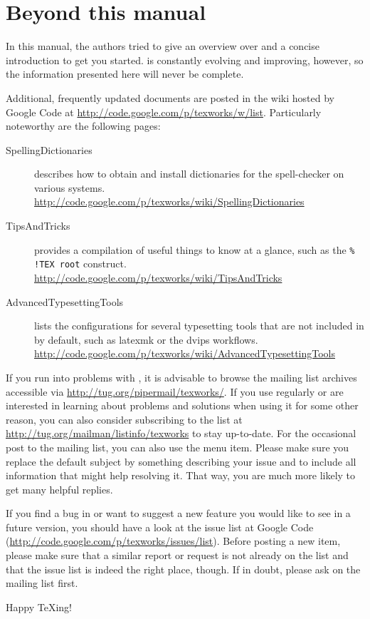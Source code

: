 
\chapter{Beyond this manual}

In this manual, the authors tried to give an overview over {\Tw} and a concise introduction to get you started. {\Tw} is constantly evolving and improving, however, so the information presented here will never be complete.

Additional, frequently updated documents are posted in the wiki hosted by Google Code at \url{http://code.google.com/p/texworks/w/list}. Particularly noteworthy are the following pages:
\begin{description}
\item[SpellingDictionaries] describes how to obtain and install dictionaries for the spell-checker on various systems. \url{http://code.google.com/p/texworks/wiki/SpellingDictionaries}
\item[TipsAndTricks] provides a compilation of useful things to know at a glance, such as the \verb|% !TEX root| construct. \url{http://code.google.com/p/texworks/wiki/TipsAndTricks}
\item[AdvancedTypesettingTools] lists the configurations for several typesetting tools that are not included in {\Tw} by default, such as latexmk or the dvips workflows. \url{http://code.google.com/p/texworks/wiki/AdvancedTypesettingTools}
\end{description}

If you run into problems with {\Tw}, it is advisable to browse the mailing list archives accessible via \url{http://tug.org/pipermail/texworks/}. If you use {\Tw} regularly or are interested in learning about problems and solutions when using it for some other reason, you can also consider subscribing to the list at \url{http://tug.org/mailman/listinfo/texworks} to stay up-to-date. For the occasional post to the mailing list, you can also use the \submenu{} menu item. Please make sure you replace the default subject by something describing your issue and to include all information that might help resolving it. That way, you are much more likely to get many helpful replies.

If you find a bug in {\Tw} or want to suggest a new feature you would like to see in a future version, you should have a look at the issue list at Google Code (\url{http://code.google.com/p/texworks/issues/list}). Before posting a new item, please make sure that a similar report or request is not already on the list and that the issue list is indeed the right place, though. If in doubt, please ask on the mailing list first.

Happy {\TeX}ing!